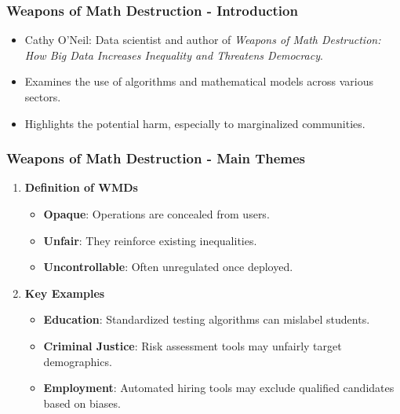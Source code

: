 \documentclass{beamer}
\begin{document}
\begin{frame}[fragile]
    \frametitle{Weapons of Math Destruction - Introduction}
    \begin{itemize}
        \item Cathy O'Neil: Data scientist and author of \textit{Weapons of Math Destruction: How Big Data Increases Inequality and Threatens Democracy}.
        \item Examines the use of algorithms and mathematical models across various sectors.
        \item Highlights the potential harm, especially to marginalized communities.
    \end{itemize}
\end{frame}

\begin{frame}[fragile]
    \frametitle{Weapons of Math Destruction - Main Themes}
    \begin{enumerate}
        \item \textbf{Definition of WMDs}
        \begin{itemize}
            \item \textbf{Opaque}: Operations are concealed from users.
            \item \textbf{Unfair}: They reinforce existing inequalities.
            \item \textbf{Uncontrollable}: Often unregulated once deployed.
        \end{itemize}
        
        \item \textbf{Key Examples}
        \begin{itemize}
            \item \textbf{Education}: Standardized testing algorithms can mislabel students.
            \item \textbf{Criminal Justice}: Risk assessment tools may unfairly target demographics.
            \item \textbf{Employment}: Automated hiring tools may exclude qualified candidates based on biases.
        \end{itemize}
    \end{enumerate}
\end{frame}
\end{document}
